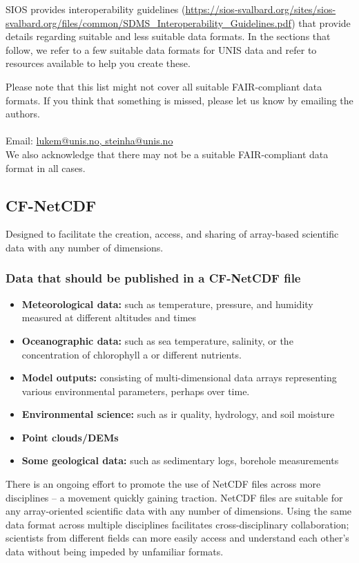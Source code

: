 \documentclass[a4paper,12pt]{article}
\makeatletter
\newcommand{\emailauthors}{\href{mailto:lukem@unis.no,steinha@unis.no}{lukem@unis.no, steinha@unis.no}}
\makeatother
\begin{document}
SIOS provides interoperability guidelines (\url{https://sios-svalbard.org/sites/sios-svalbard.org/files/common/SDMS_Interoperability_Guidelines.pdf}) that provide details regarding suitable and less suitable data formats. In the sections that follow, we refer to a few suitable data formats for UNIS data and refer to resources available to help you create these.

Please note that this list might not cover all suitable FAIR-compliant data formats. If you think that something is missed, please let us know by emailing the authors.\\ \\
Email: \emailauthors  \\

We also acknowledge that there may not be a suitable FAIR-compliant data format in all cases.

\subsection{CF-NetCDF}

Designed to facilitate the creation, access, and sharing of array-based scientific data with any number of dimensions.

\subsubsection{Data that should be published in a CF-NetCDF file}
\begin{itemize}
\item \textbf{Meteorological data:} such as temperature, pressure, and humidity measured at different altitudes and times
\item \textbf{Oceanographic data:} such as sea temperature, salinity, or the concentration of chlorophyll a or different nutrients.
\item \textbf{Model outputs:} consisting of multi-dimensional data arrays representing various environmental parameters, perhaps over time.
\item \textbf{Environmental science:} such as ir quality, hydrology, and soil moisture
\item \textbf{Point clouds/DEMs}
\item \textbf{Some geological data:} such as sedimentary logs, borehole measurements
\end{itemize}

There is an ongoing effort to promote the use of NetCDF files across more disciplines – a movement quickly gaining traction. NetCDF files are suitable for any array-oriented scientific data with any number of dimensions. Using the same data format across multiple disciplines facilitates cross-disciplinary collaboration; scientists from different fields can more easily access and understand each other’s data without being impeded by unfamiliar formats.
\end{document}
